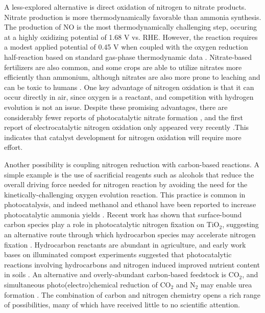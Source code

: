 A less-explored alternative is direct oxidation of nitrogen to nitrate products. Nitrate production is more thermodynamically favorable than ammonia synthesis. The production of NO is the most thermodynamically challenging step, occuring at a highly oxidizing potential of 1.68 V vs. RHE. However, the reaction requires a modest applied potential of 0.45 V when coupled with the oxygen reduction half-reaction based on standard gas-phase thermodynamic data \cite{Chen_2018,Medford_2017, Comer_2018}. Nitrate-based fertilizers are also common, and some crops are able to utilize nitrates more efficiently than ammonium, although nitrates are also more prone to leaching and can be toxic to humans \cite{Wiesler_1998,Yao_2011,Mancino_1990, NAP9038}. One key advantage of nitrogen oxidation is that it can occur directly in air, since oxygen is a reactant, and competition with hydrogen evolution is not an issue. Despite these promising advantages, there are considerably fewer reports of photocatalytic nitrate formation \cite{Bickley_1979,Yuan_2013}, and the first report of electrocatalytic nitrogen oxidation only appeared very recently \cite{Wang_2019}.This indicates that catalyst development for nitrogen oxidation will require more effort. %
%

Another possibility is coupling nitrogen reduction with carbon-based reactions. A simple example is the use of sacrificial reagents such as alcohols that reduce the overall driving force needed for nitrogen reaction by avoiding the need for the kinetically-challenging oxygen evolution reaction. This practice is common in photocatalysis, and indeed methanol and ethanol have been reported to increase photocatalytic ammonia yields \cite{Ullmann_amm_2006}. Recent work has shown that surface-bound carbon species play a role in photocatalytic nitrogen fixation on TiO$_2$, suggesting an alternative route through which hydrocarbon species may accelerate nitrogen fixation \cite{Comer_JACS}. Hydrocarbon reactants are abundant in agriculture, and early work bases on illuminated compost experiments suggested that photocatalytic reactions involving hydrocarbons and nitrogen induced improved nutrient content in soils \cite{Dhar_1941}. An alternative and overly-abundant carbon-based feedstock is CO$_2$, and simultaneous photo(electro)chemical reduction of CO$_2$ and N$_2$ may enable urea formation \cite{Srinivas_2011}. 
The combination of carbon and nitrogen chemistry opens a rich range of possibilities, many of which have received little to no scientific attention.

